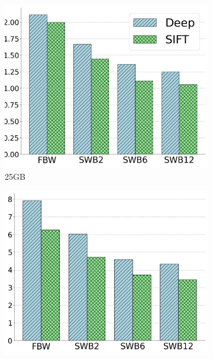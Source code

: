 \begin{figure}[htbp]
\begin{subfigure}{0.028\textwidth}
        \vspace{0.5cm}
        \label{fig:1M_Time}
    \end{subfigure}
     \centering
        \begin{subfigure}{0.31\textwidth}
            \captionsetup{justification=centering}
	\centering	
        \includegraphics[width=\textwidth]{../img/oigas/SWB/25GB_Idx.jpg}
        \caption{25GB}
        \label{fig:SWB:25GB_Time}
    \end{subfigure}    
         \begin{subfigure}{0.31\textwidth}
             \captionsetup{justification=centering}
	\centering	
        \includegraphics[width=\textwidth]{../img/oigas/SWB/100GB_Idx.jpg}

\end{subfigure}
\end{figure}
